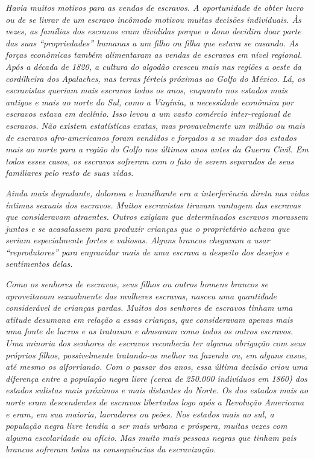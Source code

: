 \emph{Havia muitos motivos para as vendas de escravos. A oportunidade de
obter lucro ou de se livrar de um escravo incômodo motivou muitas
decisões individuais. Às vezes, as famílias dos escravos eram divididas
porque o dono decidira doar parte das suas ``propriedades'' humanas a um
filho ou filha que estava se casando. As forças econômicas também
alimentaram as vendas de escravos em nível regional. Após a década de
1820, a cultura do algodão cresceu mais nas regiões a oeste da
cordilheira dos Apalaches, nas terras férteis próximas ao Golfo do
México. Lá, os escravistas queriam mais escravos todos os anos, enquanto
nos estados mais antigos e mais ao norte do Sul, como a Virgínia, a
necessidade econômica por escravos estava em declínio. Isso levou a um
vasto comércio inter-regional de escravos. Não existem estatísticas
exatas, mas provavelmente um milhão ou mais de escravos afro-americanos
foram vendidos e forçados a se mudar dos estados mais ao norte para a
região do Golfo nos últimos anos antes da Guerra Civil. Em todos esses
casos, os escravos sofreram com o fato de serem separados de seus
familiares pelo resto de suas vidas.}

\emph{Ainda mais degradante, dolorosa e humilhante era a interferência
direta nas vidas íntimas sexuais dos escravos. Muitos escravistas
tiravam vantagem das escravas que consideravam atraentes. Outros exigiam
que determinados escravos morassem juntos e se acasalassem para produzir
crianças que o proprietário achava que seriam especialmente fortes e
valiosas. Alguns brancos chegavam a usar ``reprodutores'' para
engravidar mais de uma escrava a despeito dos desejos e sentimentos
delas.}

\emph{Como os senhores de escravos, seus filhos ou outros homens brancos
se aproveitavam sexualmente das mulheres escravas, nasceu uma quantidade
considerável de crianças pardas. Muitos dos senhores de escravos tinham
uma atitude desumana em relação a essas crianças, que consideravam
apenas mais uma fonte de lucros e as tratavam e abusavam como todos os
outros escravos. Uma minoria dos senhores de escravos reconhecia ter
alguma obrigação com seus próprios filhos, possivelmente tratando-os
melhor na fazenda ou, em alguns casos, até mesmo os alforriando. Com o
passar dos anos, essa última decisão criou uma diferença entre a
população negra livre (cerca de 250.000 indivíduos em 1860) dos estados
sulistas mais próximos e mais distantes do Norte. Os dos estados mais ao
norte eram descendentes de escravos libertados logo após a Revolução
Americana e eram, em sua maioria, lavradores ou peões. Nos estados mais
ao sul, a população negra livre tendia a ser mais urbana e próspera,
muitas vezes com alguma escolaridade ou ofício. Mas muito mais pessoas
negras que tinham pais brancos sofreram todas as consequências da
escravização.}


